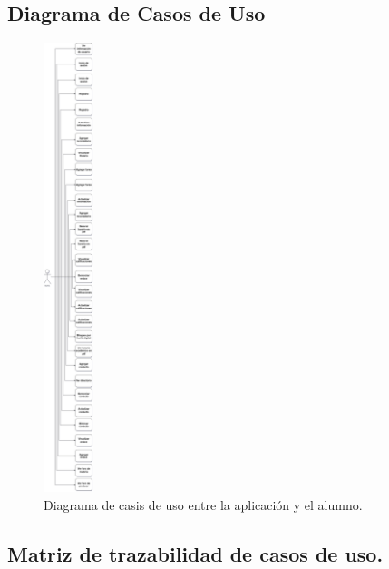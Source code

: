 \documentclass[10pt]{article}
\begin{document}
\subsection{Diagrama de Casos de Uso}
\begin{figure}[H]
    \begin{center}
    \includegraphics[width=0.13\textwidth]{Imagenes/SOE_CASOSDEUSO.PNG}
    \caption{Diagrama de casis de uso entre la aplicación y el alumno.}
\label{fig1}
    \end{center}
\end{figure} 


\newpage
\subsection{Matriz de trazabilidad de casos de uso.}
\end{document}
